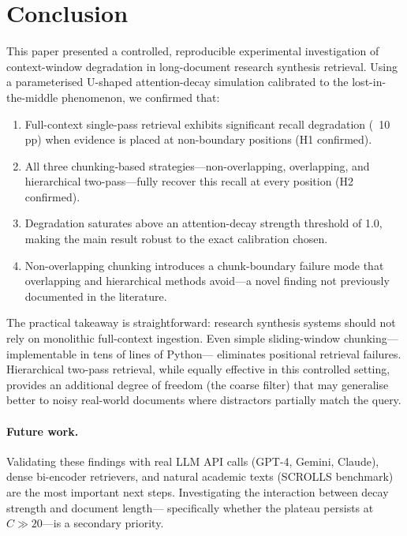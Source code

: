 \documentclass[sigconf,nonacm]{acmart}
\begin{document}
\section{Conclusion}
\label{sec:conclusion}

This paper presented a controlled, reproducible experimental investigation of
context-window degradation in long-document research synthesis retrieval.
Using a parameterised U-shaped attention-decay simulation calibrated to the
lost-in-the-middle phenomenon, we confirmed that:
\begin{enumerate}
  \item Full-context single-pass retrieval exhibits significant recall degradation
        (~10 pp) when evidence is placed at non-boundary positions (H1 confirmed).
  \item All three chunking-based strategies—non-overlapping, overlapping, and
        hierarchical two-pass—fully recover this recall at every position (H2 confirmed).
  \item Degradation saturates above an attention-decay strength threshold of 1.0,
        making the main result robust to the exact calibration chosen.
  \item Non-overlapping chunking introduces a chunk-boundary failure mode that
        overlapping and hierarchical methods avoid—a novel finding not previously
        documented in the literature.
\end{enumerate}

The practical takeaway is straightforward: research synthesis systems should
not rely on monolithic full-context ingestion.
Even simple sliding-window chunking—implementable in tens of lines of Python—
eliminates positional retrieval failures.
Hierarchical two-pass retrieval, while equally effective in this controlled
setting, provides an additional degree of freedom (the coarse filter) that may
generalise better to noisy real-world documents where distractors partially
match the query.

\paragraph{Future work.}
Validating these findings with real LLM API calls (GPT-4, Gemini, Claude),
dense bi-encoder retrievers, and natural academic texts (SCROLLS benchmark)
are the most important next steps.
Investigating the interaction between decay strength and document length—
specifically whether the plateau persists at $C \gg 20$—is a secondary priority.
\end{document}

